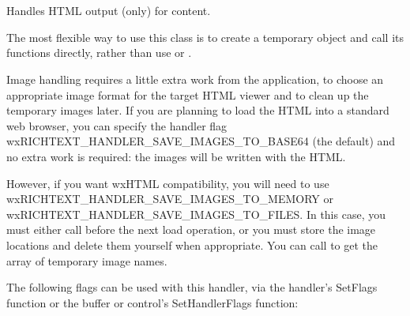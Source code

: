 \section{}\label{wxrichtexthtmlhandler}

Handles HTML output (only) for  content.

The most flexible way to use this class is to create a temporary object and call
its functions directly, rather than use  or\rtfsp
{}.

Image handling requires a little extra work from the application, to choose an
appropriate image format for the target HTML viewer and to clean up the temporary images
later. If you are planning to load the HTML into a standard web browser, you can
specify the handler flag wxRICHTEXT\_HANDLER\_SAVE\_IMAGES\_TO\_BASE64 (the default)
and no extra work is required: the images will be written with the HTML.

However, if you want wxHTML compatibility, you will need to use wxRICHTEXT\_HANDLER\_SAVE\_IMAGES\_TO\_MEMORY
or wxRICHTEXT\_HANDLER\_SAVE\_IMAGES\_TO\_FILES. In this case, you must either call  before
the next load operation, or you must store the image
locations and delete them yourself when appropriate. You can call  to
get the array of temporary image names.


The following flags can be used with this handler, via
the handler's SetFlags function or the buffer or control's
SetHandlerFlags function:

\twocolwidtha{7cm}
\begin{twocollist}\itemsep=0pt

\end{twocollist}

